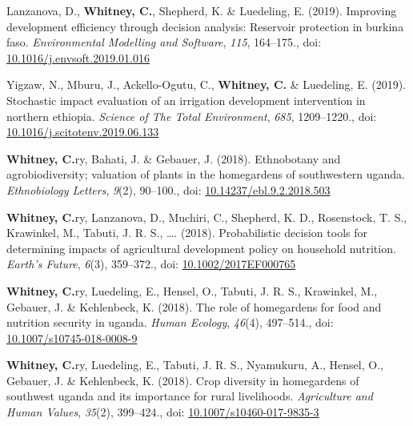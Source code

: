 \documentclass[11pt,a4paper,]{awesome-cv}
\newlength{\cslhangindent}
\newenvironment{CSLReferences}[2] %
 {\begin{list}{}{%
  \setlength{\itemindent}{0pt}
  \setlength{\leftmargin}{0pt}
  \setlength{\parsep}{0pt}
  \ifodd #1
   \setlength{\leftmargin}{\cslhangindent}
   \setlength{\itemindent}{-1\cslhangindent}
  \fi
  \setlength{\itemsep}{#2\baselineskip}}}
 {\end{list}}
\begin{document}
\begin{CSLReferences}{1}{0}
Lanzanova, D., \textbf{Whitney, C.}, Shepherd, K. \& Luedeling, E.
(2019). Improving development efficiency through decision analysis:
Reservoir protection in burkina faso. \emph{Environmental Modelling and
Software}, \emph{115}, 164--175., doi:
\href{https://doi.org/10.1016/j.envsoft.2019.01.016}{10.1016/j.envsoft.2019.01.016}

Yigzaw, N., Mburu, J., Ackello-Ogutu, C., \textbf{Whitney, C.} \&
Luedeling, E. (2019). Stochastic impact evaluation of an irrigation
development intervention in northern ethiopia. \emph{Science of The
Total Environment}, \emph{685}, 1209--1220., doi:
\href{https://doi.org/10.1016/j.scitotenv.2019.06.133}{10.1016/j.scitotenv.2019.06.133}

\textbf{Whitney, C.}ry, Bahati, J. \& Gebauer, J. (2018). Ethnobotany
and agrobiodiversity; valuation of plants in the homegardens of
southwestern uganda. \emph{Ethnobiology Letters}, \emph{9}(2), 90--100.,
doi:
\href{https://doi.org/10.14237/ebl.9.2.2018.503}{10.14237/ebl.9.2.2018.503}

\textbf{Whitney, C.}ry, Lanzanova, D., Muchiri, C., Shepherd, K. D.,
Rosenstock, T. S., Krawinkel, M., Tabuti, J. R. S., \ldots{}. (2018).
Probabilistic decision tools for determining impacts of agricultural
development policy on household nutrition. \emph{Earth's Future},
\emph{6}(3), 359--372., doi:
\href{https://doi.org/10.1002/2017EF000765}{10.1002/2017EF000765}

\textbf{Whitney, C.}ry, Luedeling, E., Hensel, O., Tabuti, J. R. S.,
Krawinkel, M., Gebauer, J. \& Kehlenbeck, K. (2018). The role of
homegardens for food and nutrition security in uganda. \emph{Human
Ecology}, \emph{46}(4), 497--514., doi:
\href{https://doi.org/10.1007/s10745-018-0008-9}{10.1007/s10745-018-0008-9}

\textbf{Whitney, C.}ry, Luedeling, E., Tabuti, J. R. S., Nyamukuru, A.,
Hensel, O., Gebauer, J. \& Kehlenbeck, K. (2018). Crop diversity in
homegardens of southwest uganda and its importance for rural
livelihoods. \emph{Agriculture and Human Values}, \emph{35}(2),
399--424., doi:
\href{https://doi.org/10.1007/s10460-017-9835-3}{10.1007/s10460-017-9835-3}


\end{CSLReferences}
\end{document}
